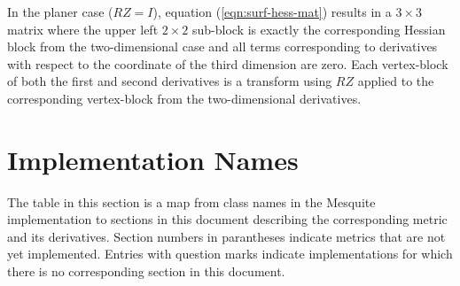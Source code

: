 \documentclass{report}
\begin{document}
\noindent In the planer case ($RZ = I$), equation (\ref{eqn:surf-hess-mat}) results in 
a $3 \times 3$  matrix where the upper left $2 \times 2$ sub-block is exactly the 
corresponding Hessian block from 
the two-dimensional case and all terms corresponding to derivatives with respect to the 
coordinate of the third dimension are zero.  Each vertex-block of both the first and second derivatives is a transform using $RZ$ applied to the corresponding vertex-block from the 
two-dimensional derivatives.


\chapter{Implementation Names}

The table in this section is a map from class names in the Mesquite implementation to sections in this document describing the corresponding
metric and its derivatives.  Section numbers in parantheses indicate
metrics that are not yet implemented.  Entries with question marks indicate
implementations for which there is no corresponding section in this document.\newline
\end{document}
